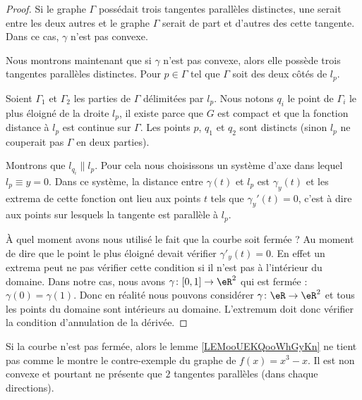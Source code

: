 \begin{proof}
    Si le graphe \( \Gamma\) possédait trois tangentes parallèles distinctes, une serait entre les deux autres et le graphe \( \Gamma\) serait de part et d'autres des cette tangente. Dans ce cas, \( \gamma\) n'est pas convexe.

    Nous montrons maintenant que si \( \gamma\) n'est pas convexe, alors elle possède trois tangentes parallèles distinctes. Pour \( p\in \Gamma\) tel que \( \Gamma\) soit des deux côtés de \( l_p\).

    Soient \( \Gamma_1\) et \( \Gamma_2\) les parties de \( \Gamma\) délimitées par \( l_p\). Nous notons \( q_i\) le point de \( \Gamma_i\) le plus éloigné de la droite \( l_p\), il existe parce que \( G\) est compact et que la fonction distance à \( l_p\) est continue sur \( \Gamma\). Les points \( p\), \( q_1\) et \( q_2\) sont distincts (sinon \( l_p\) ne couperait pas \( \Gamma\) en deux parties).

    Montrons que \( l_{q_i}\parallel l_p\). Pour cela nous choisissons un système d'axe dans lequel \( l_p\equiv y=0\). Dans ce système, la distance entre \( \gamma(t)\) et \( l_p\) est \( \gamma_y(t)\) et les extrema de cette fonction ont lieu aux points \( t\) tels que \( \gamma_y'(t)=0\), c'est à dire aux points sur lesquels la tangente est parallèle à \( l_p\).

    À quel moment avons nous utilisé le fait que la courbe soit fermée ? Au moment de dire que le point le plus éloigné devait vérifier \( \gamma'_y(t)=0\). En effet un extrema peut ne pas vérifier cette condition si il n'est pas à l'intérieur du domaine. Dans notre cas, nous avons \( \gamma\colon \mathopen[ 0 , 1 \mathclose]\to \eR^2\) qui est fermée :  \( \gamma(0)=\gamma(1)\). Donc en réalité nous pouvons considérer \( \gamma\colon \eR\to \eR^2\) et tous les points du domaine sont intérieurs au domaine. L'extremum doit donc vérifier la condition d'annulation de la dérivée.
\end{proof}

\begin{example}
    Si la courbe n'est pas fermée, alors le lemme \ref{LEMooUEKQooWhGyKn} ne tient pas comme le montre le contre-exemple du graphe de \( f(x)=x^3-x\). Il est non convexe et pourtant ne présente que \( 2\) tangentes parallèles (dans chaque directions).
\end{example}

